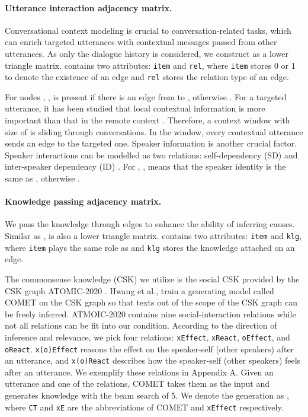 \documentclass{article}
\begin{document}
\paragraph{Utterance interaction adjacency matrix.} Conversational context modeling is crucial to conversation-related tasks, which can enrich targeted utterances with contextual messages passed from other utterances. As only the dialogue history is considered, we construct  as a lower triangle matrix.  contains two attributes: {\tt item} and {\tt rel}, where {\tt item} stores 0 or 1 to denote the existence of an edge and {\tt rel} stores the relation type of an edge. 

For nodes , ,  is present if there is an edge from  to , otherwise . For a targeted utterance, it has been studied that local contextual information is more important than that in the remote context \cite{DAG}. Therefore, a context window with size of  is sliding through conversations. In the window, every contextual utterance sends an edge to the targeted one. 
Speaker information is another crucial factor. Speaker interactions can be modelled as two relations: self-dependency (SD) and inter-speaker dependency (ID) \cite{DialogueGCN}. For , ,  means that the speaker identity  is the same as , otherwise . 

\paragraph{Knowledge passing adjacency matrix.} We pass the knowledge through edges to enhance the ability of inferring causes. Similar as ,  is also a lower triangle matrix.  contains two attributes: {\tt item} and {\tt klg}, where {\tt item} plays the same role as  and {\tt klg} stores the knowledge attached on an edge. 

The commonsense knowledge (CSK) we utilize is the social CSK provided by the CSK graph ATOMIC-2020 \cite{ATOMIC2020}. Hwang et al.,  train a generating model called COMET \cite{COMET} on the CSK graph so that texts out of the scope of the CSK graph can be freely inferred. ATMOIC-2020 contains nine social-interaction relations while not all relations can be fit into our condition. According to the direction of inference and relevance, we pick four relations: \texttt{xEffect}, \texttt{xReact}, \texttt{oEffect}, and \texttt{oReact}. \texttt{x(o)Effect} reasons the effect on the speaker-self (other speakers) after an utterance, and \texttt{x(o)React} describes how the speaker-self (other speakers) feels after an utterance. We exemplify these relations in Appendix A. Given an utterance  and one of the relations, COMET takes them as the input and generates knowledge with the beam search of 5. We denote the generation as , where \texttt{CT} and \texttt{xE} are the abbreviations of COMET and \texttt{xEffect} respectively. 
\end{document}
